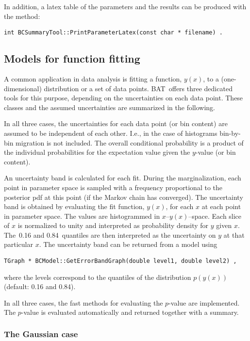 \documentclass[11pt, a4paper]{article}
\newcommand{\bat}{{\sc BAT}}
\begin{document}
In addition, a latex table of the parameters and the results can be
produced with the method:
%
\begin{verbatim}
int BCSummaryTool::PrintParameterLatex(const char * filename) .
\end{verbatim}

\subsection{Models for function fitting}
\label{subsection:fitting}

A common application in data analysis is fitting a function, $y(x)$,
to a (one-dimensional) distribution or a set of data
points. \bat\ offers three dedicated tools for this purpose, depending
on the uncertainties on each data point. These classes and the assumed
uncertainties are summarized in the following.

In all three cases, the uncertainties for each data point (or bin
content) are assumed to be independent of each other. I.e., in the
case of histograms bin-by-bin migration is not included. The overall
conditional probability is a product of the individual probabilities
for the expectation value given the $y$-value (or bin content).

An uncertainty band is calculated for each fit. During the
marginalization, each point in parameter space is sampled with a
frequency proportional to the posterior pdf at this point (if the
Markov chain has converged). The uncertainty band is obtained by
evaluating the fit function, $y(x)$, for each $x$ at each point in
parameter space. The values are histogrammed in
$x$--$y(x)$--space. Each slice of $x$ is normalized to unity and
interpreted as probability density for $y$ given $x$. The~0.16 and
0.84~quantiles are then interpreted as the uncertainty on $y$ at that
particular $x$. The uncertainty band can be returned from a model
using
%
\begin{verbatim}
TGraph * BCModel::GetErrorBandGraph(double level1, double level2) ,
\end{verbatim}
%
where the levels correspond to the quantiles of the distribution
$p(y(x))$ (default: 0.16 and 0.84).

In all three cases, the fast methods for evaluating the $p$-value are
implemented. The $p$-value is evaluated automatically and returned
together with a summary.

\subsubsection{The Gaussian case}
\label{BCGraphFitter}
\end{document}
